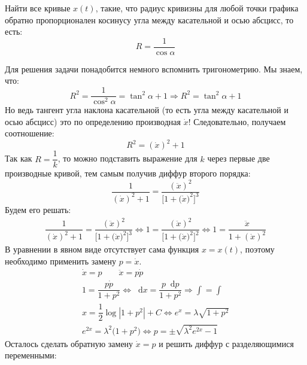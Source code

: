 \documentclass[a4paper,12pt]{article}
\renewcommand*\d{\mathop{}\!\mathrm{d}}
\newcommand{\dpp}{\dot{p}}
\newcommand{\dx}{\dot{x}}
\newcommand{\ddx}{\ddot{x}}
\newcommand{\bto}{\Longrightarrow}
\newcommand{\ds}{\displaystyle}
\begin{document}
Найти все кривые $x(t)$, такие, что радиус кривизны для любой точки графика обратно пропорционален косинусу угла между касательной и осью абсцисс, то есть:
\[R = \dfrac{1}{\cos\alpha}\]

Для решения задачи понадобится немного вспомнить тригонометрию. Мы знаем, что:
\[R^2 = \dfrac{1}{\cos^2\alpha} = \tan^2\alpha + 1 \bto R^2 = \tan^2\alpha + 1\]
Но ведь тангент угла наклона касательной (то есть угла между касательной и осью абсцисс) это по определению производная $\dx$! Следовательно, получаем соотношение:
\[R^2 = (\dx)^2 + 1\]
Так как $R = \dfrac{1}{k}$, то можно подставить выражение для $k$ через первые две производные кривой, тем самым получив диффур второго порядка:
\[\dfrac{1}{(\dx)^2 + 1} = \dfrac{(\ddx)^2}{\Big[1 + \big(\dx\big)^2\Big]^3}\]
Будем его решать:
\begin{gather*}
	\dfrac{1}{(\dx)^2 + 1} = \dfrac{(\ddx)^2}{\Big[1 + \big(\dx\big)^2\Big]^3} \iff 1 = \dfrac{(\ddx)^2}{\Big[1 + \big(\dx\big)^2\Big]^2} \iff 1 = \dfrac{\ddx}{1 + (\dx)^2}
\end{gather*}
В уравнении в явном виде отсутствует сама функция $x = x(t)$, поэтому необходимо применить замену $p = \dx$.
\begin{gather*}
	\dx = p \qquad \ddx = p\dpp\\
	1 = \dfrac{p\dpp}{1 + p^2} \iff \d x = \dfrac{p\d p}{1 + p^2} \bto \ds\int = \int\\
	x = \dfrac{1}{2}\log|1 + p^2| + C \iff e^x = \lambda\sqrt{1 + p^2}\\
	e^{2x} = \lambda^2\big(1 + p^2\big) \iff p = \pm\sqrt{\lambda^2e^{2x} - 1}
\end{gather*}
Осталось сделать обратную замену $\dx = p$ и решить диффур с разделяющимися переменными:
\end{document}
